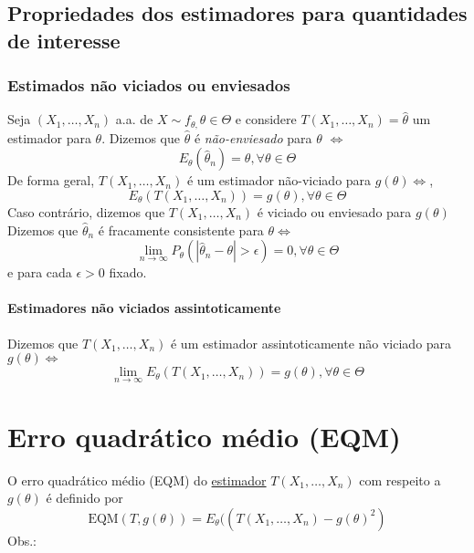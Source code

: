 \documentclass[
  letterpaper,
  DIV=11,
  numbers=noendperiod]{scrreprt}
\begin{document}
\section{Propriedades dos estimadores para quantidades de
interesse}\label{propriedades-dos-estimadores-para-quantidades-de-interesse}

\subsection{Estimados não viciados ou
enviesados}\label{estimados-nuxe3o-viciados-ou-enviesados}

Seja \((X_{1},\dots,X_{n})\) a.a. de
\(X\sim f_{\theta,}\theta \in \Theta\) e considere
\(T(X_{1},\dots,X_{n})=\hat\theta\) um estimador para \(\theta\).
Dizemos que \(\hat \theta\) é \emph{não-enviesado} para \(\theta\)
\(\Leftrightarrow\) \[
E_\theta(\hat \theta_{n}) = \theta, \forall \theta \in \Theta
\] De forma geral, \(T(X_{1},\dots,X_{n})\) é um estimador não-viciado
para \(g(\theta) \Leftrightarrow\), \[
E_\theta(T(X_{1},\dots,X_{n}))=g(\theta), \forall \theta \in \Theta
\] Caso contrário, dizemos que \(T(X_{1},\dots,X_{n})\) é viciado ou
enviesado para \(g(\theta)\) Dizemos que \(\hat\theta_{n}\) é fracamente
consistente para \(\theta \Leftrightarrow\) \[
\lim_{n\to \infty}{P_\theta(|\hat \theta_{n}- \theta| > \epsilon)=0, \forall \theta \in \Theta}
\] e para cada \(\epsilon>0\) fixado.

\subsubsection{Estimadores não viciados
assintoticamente}\label{estimadores-nuxe3o-viciados-assintoticamente}

Dizemos que \(T(X_{1},\dots,X_{n})\) é um estimador assintoticamente não
viciado para \(g(\theta) \Leftrightarrow\) \[
\lim_{n\to \infty}{E_\theta(T(X_{1},\dots,X_{n}))} = g(\theta), \forall \theta \in \Theta
\]


\chapter{Erro quadrático médio
(EQM)}\label{erro-quadruxe1tico-muxe9dio-eqm}

O erro quadrático médio (EQM) do \href{estimadores.qmd}{estimador}
\(T(X_{1},\dots,X_{n})\) com respeito a \(g(\theta)\) é definido por \[
\mathrm{EQM}(T,g(\theta))=E_{\theta}((T(X_{1},\dots,X_{n})-g(\theta)^{2})
\] Obs.:
\end{document}
